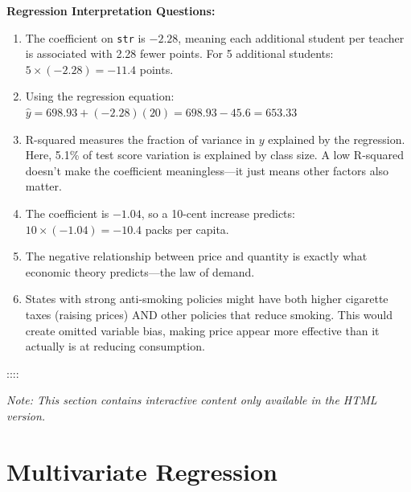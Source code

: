 \documentclass[
  letterpaper,
  DIV=11,
  numbers=noendperiod]{scrreprt}
\begin{document}
\begin{tcolorbox}
\textbf{Regression Interpretation Questions:}

\begin{enumerate}
\def\labelenumi{\roman{enumi}.}
\setcounter{enumi}{7}
\item
  The coefficient on \texttt{str} is \(-2.28\), meaning each additional
  student per teacher is associated with 2.28 fewer points. For 5
  additional students: \(5 \times (-2.28) = -11.4\) points.
\item
  Using the regression equation:
  \(\hat{y} = 698.93 + (-2.28)(20) = 698.93 - 45.6 = 653.33\)
\item
  R-squared measures the fraction of variance in \(y\) explained by the
  regression. Here, 5.1\% of test score variation is explained by class
  size. A low R-squared doesn't make the coefficient meaningless---it
  just means other factors also matter.
\item
  The coefficient is \(-1.04\), so a 10-cent increase predicts:
  \(10 \times (-1.04) = -10.4\) packs per capita.
\item
  The negative relationship between price and quantity is exactly what
  economic theory predicts---the law of demand.
\item
  States with strong anti-smoking policies might have both higher
  cigarette taxes (raising prices) AND other policies that reduce
  smoking. This would create omitted variable bias, making price appear
  more effective than it actually is at reducing consumption.
\end{enumerate}

\end{tcolorbox}

::::

\emph{Note: This section contains interactive content only available in
the HTML version.}


\chapter{Multivariate Regression}\label{sec-multivariate}
\end{document}
